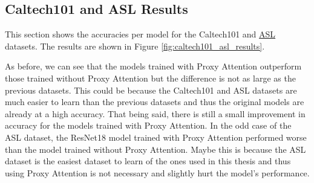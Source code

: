 \documentclass[a4paper,11pt,openright]{book}
\begin{document}
\subsection{Caltech101 and ASL Results}
This section shows the accuracies per model for the Caltech101 \cite{liCaltech101} and \href{https://www.kaggle.com/datasets/grassknoted/asl-alphabet}{ASL} datasets. The results are shown in Figure \ref{fig:caltech101_asl_results}.

As before, we can see that the models trained with Proxy Attention outperform those trained without Proxy Attention but the difference is not as large as the previous datasets. This could be because the Caltech101 and ASL datasets are much easier to learn than the previous datasets and thus the original models are already at a high accuracy. That being said, there is still a small improvement in accuracy for the models trained with Proxy Attention. In the odd case of the ASL dataset, the ResNet18 model trained with Proxy Attention performed worse than the model trained without Proxy Attention. Maybe this is because the ASL dataset is the easiest dataset to learn of the ones used in this thesis and thus using Proxy Attention is not necessary and slightly hurt the model's performance.
\end{document}
